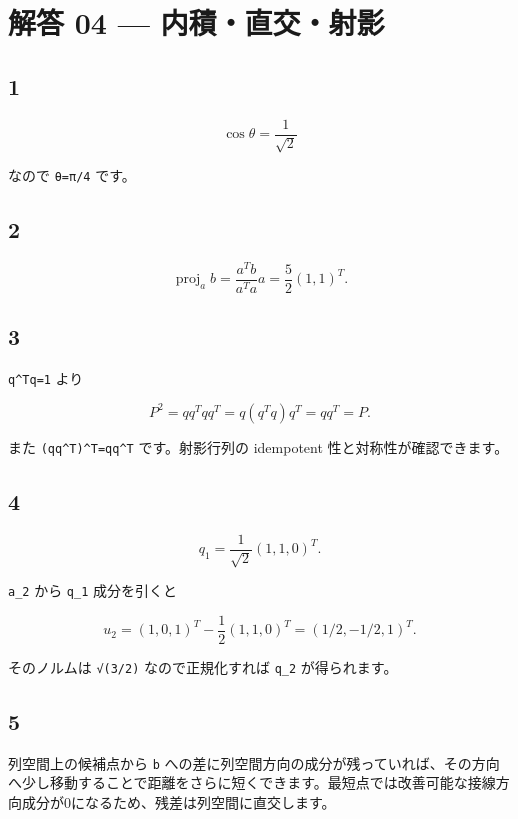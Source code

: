 \documentclass[
  11pt,
  a4paper,
]{ltjsarticle}
\author{}
\date{}
\begin{document}
\hypertarget{ux89e3ux7b54-04-ux5185ux7a4dux76f4ux4ea4ux5c04ux5f71}{%
\section{解答 04 ---
内積・直交・射影}\label{ux89e3ux7b54-04-ux5185ux7a4dux76f4ux4ea4ux5c04ux5f71}}

\hypertarget{section}{%
\subsection{1}\label{section}}

\[
\cos\theta=\frac{1}{\sqrt2}
\]

なので \texttt{θ=π/4} です。

\hypertarget{section-1}{%
\subsection{2}\label{section-1}}

\[
\operatorname{proj}_a b=\frac{a^Tb}{a^Ta}a=\frac52(1,1)^T.
\]

\hypertarget{section-2}{%
\subsection{3}\label{section-2}}

\texttt{q\^{}Tq=1} より

\[
P^2=qq^Tqq^T=q(q^Tq)q^T=qq^T=P.
\]

また \texttt{(qq\^{}T)\^{}T=qq\^{}T} です。射影行列の idempotent
性と対称性が確認できます。

\hypertarget{section-3}{%
\subsection{4}\label{section-3}}

\[
q_1=\frac1{\sqrt2}(1,1,0)^T.
\]

\texttt{a\_2} から \texttt{q\_1} 成分を引くと

\[
u_2=(1,0,1)^T-\frac12(1,1,0)^T=(1/2,-1/2,1)^T.
\]

そのノルムは \texttt{√(3/2)} なので正規化すれば \texttt{q\_2}
が得られます。

\hypertarget{section-4}{%
\subsection{5}\label{section-4}}

列空間上の候補点から \texttt{b}
への差に列空間方向の成分が残っていれば、その方向へ少し移動することで距離をさらに短くできます。最短点では改善可能な接線方向成分が0になるため、残差は列空間に直交します。
\end{document}
